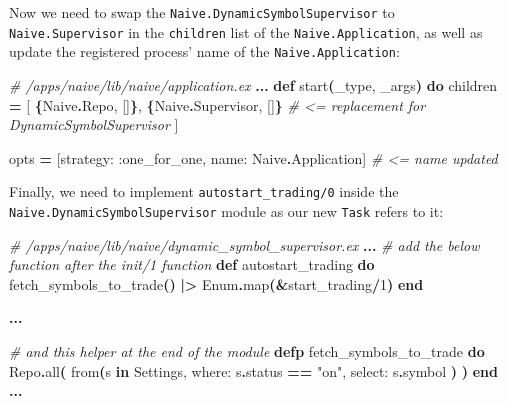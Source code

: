 \documentclass[
  oneside]{book}
\newenvironment{Shaded}{\begin{snugshade}}{\end{snugshade}}
\newcommand{\CommentTok}[1]{\textcolor[rgb]{0.56,0.35,0.01}{\textit{#1}}}
\newcommand{\ConstantTok}[1]{\textcolor[rgb]{0.56,0.35,0.01}{#1}}
\newcommand{\DecValTok}[1]{\textcolor[rgb]{0.00,0.00,0.81}{#1}}
\newcommand{\FunctionTok}[1]{\textcolor[rgb]{0.13,0.29,0.53}{\textbf{#1}}}
\newcommand{\KeywordTok}[1]{\textcolor[rgb]{0.13,0.29,0.53}{\textbf{#1}}}
\newcommand{\NormalTok}[1]{#1}
\newcommand{\OperatorTok}[1]{\textcolor[rgb]{0.81,0.36,0.00}{\textbf{#1}}}
\newcommand{\OtherTok}[1]{\textcolor[rgb]{0.56,0.35,0.01}{#1}}
\newcommand{\StringTok}[1]{\textcolor[rgb]{0.31,0.60,0.02}{#1}}
\newcommand{\VariableTok}[1]{\textcolor[rgb]{0.00,0.00,0.00}{#1}}
\begin{document}
Now we need to swap the \texttt{Naive.DynamicSymbolSupervisor} to \texttt{Naive.Supervisor} in the \texttt{children} list of the \texttt{Naive.Application}, as well as update the registered process' name of the \texttt{Naive.Application}:

\begin{Shaded}
\begin{Highlighting}[]
\CommentTok{\# /apps/naive/lib/naive/application.ex}
  \OperatorTok{...}
  \KeywordTok{def}\NormalTok{ start}\FunctionTok{(}\NormalTok{\_type, \_args}\FunctionTok{)} \KeywordTok{do}
\NormalTok{    children }\OperatorTok{=} \OtherTok{[}
      \FunctionTok{\{}\ConstantTok{Naive}\OperatorTok{.}\ConstantTok{Repo}\NormalTok{, }\OtherTok{[]}\FunctionTok{\}}\NormalTok{,}
      \FunctionTok{\{}\ConstantTok{Naive}\OperatorTok{.}\ConstantTok{Supervisor}\NormalTok{, }\OtherTok{[]}\FunctionTok{\}} \CommentTok{\# \textless{}= replacement for DynamicSymbolSupervisor}
    \OtherTok{]}

\NormalTok{    opts }\OperatorTok{=} \OtherTok{[}\VariableTok{strategy:} \VariableTok{:one\_for\_one}\NormalTok{, }\VariableTok{name:} \ConstantTok{Naive}\OperatorTok{.}\ConstantTok{Application}\OtherTok{]} \CommentTok{\# \textless{}= name updated}
\end{Highlighting}
\end{Shaded}

\newpage

Finally, we need to implement \texttt{autostart\_trading/0} inside the \texttt{Naive.DynamicSymbolSupervisor} module as our new \texttt{Task} refers to it:

\begin{Shaded}
\begin{Highlighting}[]
\CommentTok{\# /apps/naive/lib/naive/dynamic\_symbol\_supervisor.ex}
  \OperatorTok{...}
  \CommentTok{\# add the below function after the \textasciigrave{}init/1\textasciigrave{} function}
  \KeywordTok{def}\NormalTok{ autostart\_trading }\KeywordTok{do}
\NormalTok{    fetch\_symbols\_to\_trade}\FunctionTok{()}
    \OperatorTok{|\textgreater{}} \ConstantTok{Enum}\OperatorTok{.}\NormalTok{map}\FunctionTok{(}\OperatorTok{\&}\NormalTok{start\_trading}\OperatorTok{/}\DecValTok{1}\FunctionTok{)}
  \KeywordTok{end}
 
  \OperatorTok{...}

  \CommentTok{\# and this helper at the end of the module}
  \KeywordTok{defp}\NormalTok{ fetch\_symbols\_to\_trade }\KeywordTok{do}
    \ConstantTok{Repo}\OperatorTok{.}\NormalTok{all}\FunctionTok{(}
\NormalTok{      from}\FunctionTok{(}\NormalTok{s }\KeywordTok{in} \ConstantTok{Settings}\NormalTok{,}
        \VariableTok{where:}\NormalTok{ s}\OperatorTok{.}\NormalTok{status }\OperatorTok{==} \StringTok{"on"}\NormalTok{,}
        \VariableTok{select:}\NormalTok{ s}\OperatorTok{.}\NormalTok{symbol}
      \FunctionTok{)}
    \FunctionTok{)}
  \KeywordTok{end}
  \OperatorTok{...}
\end{Highlighting}
\end{Shaded}
\end{document}
